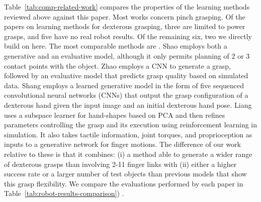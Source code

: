 Table~\ref{tab:comp-related-work} compares the properties of the learning methods reviewed above against this paper. Most works concern pinch grasping. Of the papers on learning methods for dexterous grasping, three \cite{varley2015generating,lu2017planning,detry2013a} are limited to power grasps, and five have no real robot results\cite{veres2017modeling,zhou20176dof,kappler2015leveraging,mandikal2021dexterous,Zhu2021}. Of the remaining six, two we directly build on here. The most comparable methods are \cite{Shao2020,Shang2020,Zhao2020,Liang22}. Shao \cite{Shao2020} employs both a generative and an evaluative model, although it only permits planning of 2 or 3 contact points with the object. Zhao \cite{Zhao2020} employs a CNN to generate a grasp, followed by an evaluative model that predicts grasp quality based on simulated data. Shang \cite{Shang2020} employs a learned generative model in the form of five sequenced convolutional neural networks (CNNs) that output the grasp configuration of a dexterous hand given the input image and an initial dexterous hand pose. Liang \cite{Liang22} uses a subspace learner for hand-shapes based on PCA and then refines parameters controlling the grasp and its execution using reinforcement learning in simulation. It also takes tactile information, joint torques, and proprioception as inputs to a generative network for finger motions. The difference of our work relative to these is that it combines: (i) a method able to  generate a wider range of dexterous grasps than \cite{varley2015generating,lu2017planning,detry2013a,Shao2020,Shang2020,Zhao2020} involving 2-11 finger links with (ii) either a higher success rate or a larger number of test objects than previous models that show this grasp flexibility. \cite{Liang22} We compare the evaluations performed by each paper in Table~\ref{tab:robot-results-comparison}) . 


